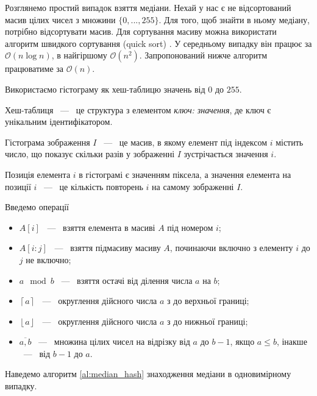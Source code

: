 Розглянемо простий випадок взяття медіани.
Нехай у нас є не відсортований масив цілих чисел з множини $\{0,..., 255\}$.
Для того, щоб знайти в ньому медіану, потрібно відсортувати масив.
Для сортування масиву можна використати алгоритм швидкого сортування (quick sort)
\cite{quick_sort}. У середньому випадку він працює за $\mathcal{O}(n\log{}n)$, в
найгіршому $\mathcal{O}(n^2)$.
Запропонований нижче алгоритм працюватиме за $\mathcal{O}(n)$.

Використаємо гістограму як хеш-таблицю  значень від $0$ до $255$.
\begin{definition}
    Хеш-таблиця ~---~ це структура з елементом \textit{{ключ: значення}}, де
    ключ є унікальним ідентифікатором.
\end{definition}

\begin{definition}
    Гістограма зображення $I$ ~---~ це масив, в якому елемент під індексом $i$ містить число, що показує скільки
    разів у зображенні $I$ зустрічається значення $i$.
\end{definition}

Позиція елемента $i$ в гістограмі є значенням піксела, а значення елемента на позиції $i$ ~---~ це
кількість повторень $i$ на самому зображенні $I$.

Введемо операції
\begin{itemize}
    \item $A[i]$ ~---~ взяття елемента в масиві $A$ під номером $i$;
    \item $A[i:j]$ ~---~ взяття підмасиву масиву $A$, починаючи включно з елементу $i$ до $j$ не включно;
    \item $a \mod b$ ~---~ взяття остачі від ділення числа $a$ на $b$;
    \item $\left\lceil a \right\rceil$ ~---~ округлення дійсного числа $a$ з до верхньої границі;
    \item $\left\lfloor a \right\rfloor$ ~---~ округлення дійсного числа $a$ з до нижньої границі;
    \item $\overline{a,b}$ ~---~ множина цілих чисел на відрізку від $a$ до $b-1$, якщо $a \le b$,
          інакше  ~---~ від $b-1$ до $a$.
\end{itemize}
Наведемо алгоритм \ref{al:median_hash} знаходження медіани в одновимірному випадку.

